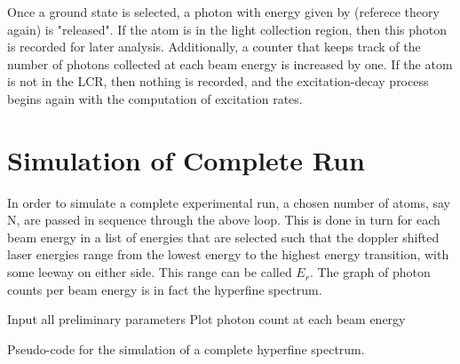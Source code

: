 Once a ground state is selected, a photon with energy given by (referece theory again) is "released". If the atom is in the light collection region, then this photon is recorded for later analysis. Additionally, a counter that keeps track of the number of photons collected at each beam energy is increased by one. If the atom is not in the LCR, then nothing is recorded, and the excitation-decay process begins again with the computation of excitation rates.

\section{Simulation of Complete Run}
In order to simulate a complete experimental run, a chosen number of atoms, say N, are passed in sequence through the above loop. This is done in turn for each beam energy in a list of energies that are selected such that the doppler shifted laser energies range from the lowest energy to the highest energy transition, with some leeway on either side. This range can be called $E_r$. The graph of photon counts per beam energy is in fact the hyperfine spectrum.

\vspace{10mm}
\begin{algorithm}[H]
\SetAlgoLined
{}
 Input all preliminary parameters\;
 Plot photon count at each beam energy\;
 \caption{Pseudo-code for the simulation of a complete hyperfine spectrum.}
\end{algorithm}

